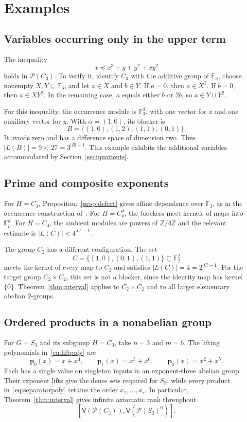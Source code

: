 \documentclass[11pt,reqno]{amsart}
\theoremstyle{definition}
\numberwithin{equation}{section}
\newcommand{\Pow}{\mathcal{P}}
\newcommand{\Full}[1]{\mathcal{P}(#1)^0}
\newcommand{\Var}{\mathsf{V}}
\newcommand{\Z}{\mathbb{Z}}
\newcommand{\F}{\mathbb{F}}
\newcommand{\bp}{\mathbf{p}}
\begin{document}
\section{Examples}\label{sec:examples}
\subsection{Variables occurring only in the upper term}
The inequality
\begin{equation}\label{eq:auxexample}
 x\preceq x^3+y+y^2+xy^2
\end{equation}
holds in $\Pow(C_3)$. To verify it, identify $C_3$ with the additive group of $\F_3$, choose nonempty $X,Y\subseteq\F_3$, and let $a\in X$ and $b\in Y$. If $a=0$, then $a\in X^3$. If $b=0$, then $a\in XY^2$. In the remaining case, $a$ equals either $b$ or $2b$, so $a\in Y\cup Y^2$.

For this inequality, the occurrence module is $\F_3^2$, with one vector for $x$ and one auxiliary vector for $y$. With $\alpha=(1,0)$, its blocker is
\[
 B=\{(1,0),(1,2),(1,1),(0,1)\}.
\]
It avoids zero and has a difference space of dimension two. Thus $|L(B)|=9<27=3^{|B|-1}$. This example exhibits the additional variables accommodated by Section~\ref{sec:quotients}.

\subsection{Prime and composite exponents}
For $H=C_3$, Proposition~\ref{prop:defect} gives affine dependence over $\F_3$, as in the occurrence construction of~\cite{note}. For $H=C_p^d$, the blockers meet kernels of maps into $\F_p^d$. For $H=C_4$, the ambient modules are powers of $\Z/4\Z$ and the relevant estimate is $|L(C)|<4^{|C|-1}$.

The group $C_2$ has a different configuration. The set
\[
 C=\{(1,0),(0,1),(1,1)\}\subseteq\F_2^2
\]
meets the kernel of every map to $C_2$ and satisfies $|L(C)|=4=2^{|C|-1}$. For the target group $C_2\times C_2$, this set is not a blocker, since the identity map has kernel $\{0\}$. Theorem~\ref{thm:interval} applies to $C_2\times C_2$ and to all larger elementary abelian $2$-groups.

\subsection{Ordered products in a nonabelian group}
For $G=S_3$ and its subgroup $H=C_3$, take $n=3$ and $m=6$. The lifting polynomials in~\eqref{eq:liftpoly} are
\[
 \bp_0(x)=x+x^4,\qquad
 \bp_1(x)=x^3+x^6,\qquad
 \bp_2(x)=x^2+x^5.
\]
Each has a single value on singleton inputs in an exponent-three abelian group. Their exponent lifts give the dense sets required for $S_3$, while every product in~\eqref{eq:separatorpoly} retains the order $x_1,\ldots,x_r$. In particular, Theorem~\ref{thm:interval} gives infinite axiomatic rank throughout
\[
 [\Var(\Pow(C_3)),\Var(\Full{S_3})].
\]
\end{document}
